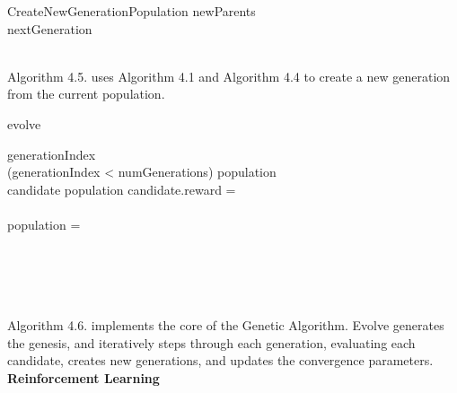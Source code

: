 \documentclass{article}
\begin{document}
\begin{pseudocode}[shadowbox]{CreateNewGeneration}{Population} 
    newParents\GETS {}\\
    nextGeneration\GETS {}\\
\end{pseudocode}
\\
Algorithm 4.5. uses Algorithm 4.1 and Algorithm 4.4 to create a new generation from the current population.


\begin{pseudocode}[shadowbox]{evolve}{ } 

generationIndex\\
\WHILE (generationIndex  < numGenerations) \DO
\BEGIN
    population\GETS {}\\
    \FOREACH candidate \in \mathcal{} population \DO
    \BEGIN
        candidate.reward = \\
    \END\\
    population = \\
    \\
    \\
    
\END\\


\end{pseudocode}
\\
Algorithm 4.6. implements the core of the Genetic Algorithm. Evolve generates the genesis, and iteratively steps through each generation, evaluating each candidate, creates new generations, and updates the convergence parameters.
\\




\noindent\textbf{Reinforcement Learning}
\end{document}
